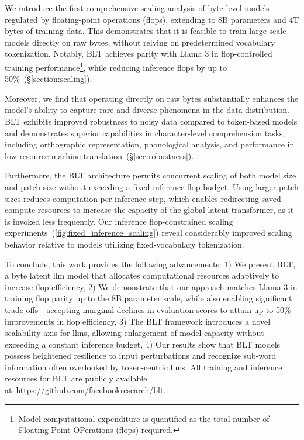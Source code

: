 We introduce the first comprehensive scaling analysis of byte-level models regulated by floating-point operations (flops), extending to 8B parameters and 4T bytes of training data. This demonstrates that it is feasible to train large-scale models directly on raw bytes, without relying on predetermined vocabulary tokenization. Notably, {\textsc BLT} achieves parity with Llama 3 in flop-controlled training performance\footnote{Model computational expenditure is quantified as the total number of Floating Point OPerations (flops) required.}, while reducing inference flops by up to 50\%~(\S\ref{section:scaling}).

Moreover, we find that operating directly on raw bytes substantially enhances the model's ability to capture rare and diverse phenomena in the data distribution. {\textsc BLT} exhibits improved robustness to noisy data compared to token-based models and demonstrates superior capabilities in character-level comprehension tasks, including orthographic representation, phonological analysis, and performance in low-resource machine translation~(\S\ref{sec:robustness}).

Furthermore, the {\textsc BLT} architecture permits concurrent scaling of both model size and patch size without exceeding a fixed inference flop budget. Using larger patch sizes reduces computation per inference step, which enables redirecting saved compute resources to increase the capacity of the global latent transformer, as it is invoked less frequently. Our inference flop-constrained scaling experiments~(\autoref{fig:fixed_inference_scaling}) reveal considerably improved scaling behavior relative to models utilizing fixed-vocabulary tokenization.

To conclude, this work provides the following advancements: 1) We present {\textsc BLT}, a byte latent llm model that allocates computational resources adaptively to increase flop efficiency, 2) We demonstrate that our approach matches Llama 3 in training flop parity up to the 8B parameter scale, while also enabling significant trade-offs—accepting marginal declines in evaluation scores to attain up to 50\% improvements in flop efficiency, 3) The {\textsc BLT} framework introduces a novel scalability axis for llms, allowing enlargement of model capacity without exceeding a constant inference budget, 4) Our results show that {\textsc BLT} models possess heightened resilience to input perturbations and recognize sub-word information often overlooked by token-centric llms. All training and inference resources for {\textsc BLT} are publicly available at~\url{https://github.com/facebookresearch/blt}.

